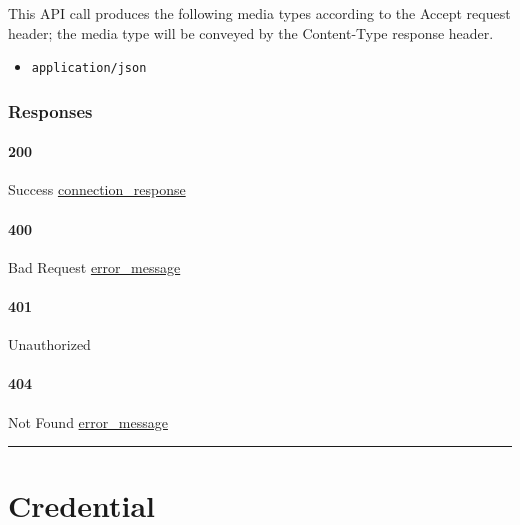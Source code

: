 This API call produces the following media types according to the
{Accept} request header; the media type will be conveyed by the
{Content-Type} response header.

\begin{itemize}
\tightlist
\item
  \texttt{application/json}
\end{itemize}

\hypertarget{responses-27}{%
\subsubsection{Responses}\label{responses-27}}

\hypertarget{section-89}{%
\paragraph{200}\label{section-89}}

Success \protect\hyperlink{connection_response}{connection\_response}

\hypertarget{section-90}{%
\paragraph{400}\label{section-90}}

Bad Request \protect\hyperlink{error_message}{error\_message}

\hypertarget{section-91}{%
\paragraph{401}\label{section-91}}

Unauthorized \protect\hyperlink{}{}

\hypertarget{section-92}{%
\paragraph{404}\label{section-92}}

Not Found \protect\hyperlink{error_message}{error\_message}

\begin{center}\rule{0.5\linewidth}{\linethickness}\end{center}

\hypertarget{credential-1}{%
\section{\texorpdfstring{\protect\hypertarget{Credential}{}{Credential}}{Credential}}\label{credential-1}}

